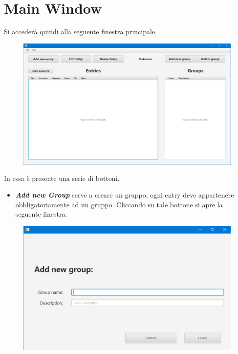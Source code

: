\documentclass[a4paper,12pt]{report}
\begin{document}
\clearpage

\section*{Main Window}
Si accederà quindi alla seguente finestra principale.

\begin{figure}[h]
\centering{}
\includegraphics[width=\textwidth]{user-manual/6}
\end{figure}

In essa è presente una serie di bottoni.
\begin{itemize}
    \item \textbf{\textit{Add new Group}} serve a creare un gruppo, ogni entry deve appartenere obbligatoriamente ad un gruppo. Cliccando su tale bottone si apre la seguente finestra.
\end{itemize}
\clearpage
\begin{figure}[h]
\centering{}
\includegraphics[width=\textwidth]{user-manual/7}
\end{figure}
\end{document}
